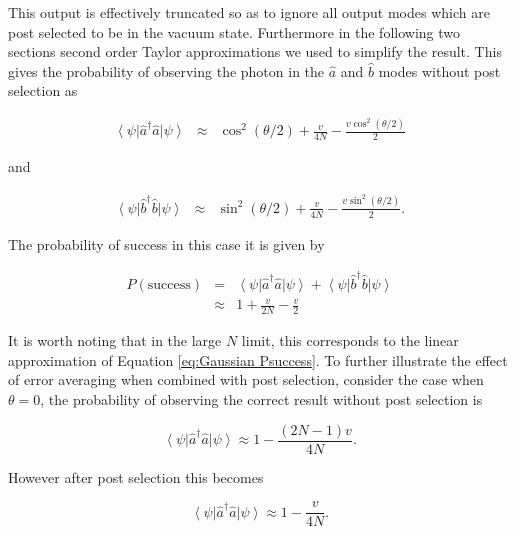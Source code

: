 \documentclass[aps,pra,twocolumn,superscriptaddress,numerical]{revtex4-1}
\begin{document}
		This output is effectively truncated so as to ignore all output modes which are post selected to be in the vacuum state. Furthermore  in the following two sections second order Taylor approximations we used to simplify the result. This gives the probability of observing the photon in the $\hat{a}$ and $\hat{b}$ modes without post selection as
		
		\begin{eqnarray}
			\left\langle \psi\right|\hat{a}^{\dagger}\hat{a}\left|\psi\right\rangle & \approx & \cos^{2}\left(\theta/2\right)+\frac{v}{4N}-\frac{v\cos^{2}(\theta/2)}{2}
		\end{eqnarray}
		
		
		and
		
		\begin{eqnarray}
			\left\langle \psi\right|\hat{b}^{\dagger}\hat{b}\left|\psi\right\rangle & \approx & \sin^{2}\left(\theta/2\right)+\frac{v}{4N}-\frac{v\sin^{2}(\theta/2)}{2}.
		\end{eqnarray}
		
		The probability of success in this case it is given by
		
		\begin{eqnarray}
			P(\textrm{success}) & = & \left\langle \psi\right|\hat{a}^{\dagger}\hat{a}\left|\psi\right\rangle +\left\langle \psi\right|\hat{b}^{\dagger}\hat{b}\left|\psi\right\rangle \\
			& \approx & 1+\frac{v}{2N}-\frac{v}{2} \label{eq:1pNarbitrary successs}
		\end{eqnarray}
		
		It is worth noting that in the large $N$ limit, this corresponds to the linear approximation of Equation \ref{eq:Gaussian Psuccess}. To further illustrate the effect of error averaging when combined with post selection, consider the case when $\theta=0$, the probability of observing the correct result without post selection is
		
		\begin{equation}
			\left\langle \psi\right|\hat{a}^{\dagger}\hat{a}\left|\psi\right\rangle \approx 1 - \frac{(2N-1)v}{4N}. \label{eq:1pNoPost}
		\end{equation}
	
		However after post selection this becomes
		
		\begin{equation}
			\left\langle \psi\right|\hat{a}^{\dagger}\hat{a}\left|\psi\right\rangle \approx 1 - \frac{v}{4N}. \label{eq:1pWithPost}
		\end{equation}
		
\end{document}
